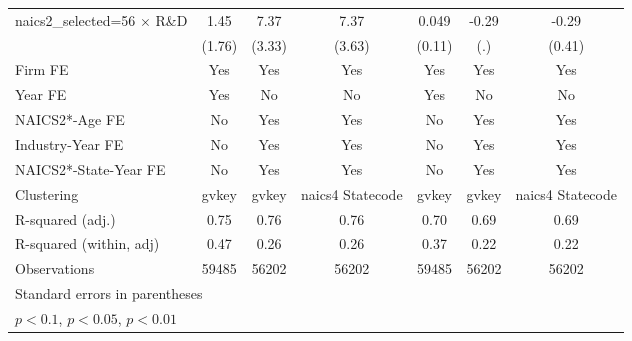 {\begin{tabular}{l*{6}{c}}
\addlinespace
naics2\_selected=56 $\times$ R\&D&        1.45         &        7.37\sym{**} &        7.37\sym{**} &       0.049         &       -0.29         &       -0.29         \\
                    &      (1.76)         &      (3.33)         &      (3.63)         &      (0.11)         &         (.)         &      (0.41)         \\
\addlinespace
Firm FE             &         Yes         &         Yes         &         Yes         &         Yes         &         Yes         &         Yes         \\
\addlinespace
Year FE             &         Yes         &          No         &          No         &         Yes         &          No         &          No         \\
\addlinespace
NAICS2*-Age FE      &          No         &         Yes         &         Yes         &          No         &         Yes         &         Yes         \\
\addlinespace
Industry-Year FE    &          No         &         Yes         &         Yes         &          No         &         Yes         &         Yes         \\
\addlinespace
NAICS2*-State-Year FE&          No         &         Yes         &         Yes         &          No         &         Yes         &         Yes         \\
\midrule
Clustering          &       gvkey         &       gvkey         &naics4 Statecode         &       gvkey         &       gvkey         &naics4 Statecode         \\
R-squared (adj.)    &        0.75         &        0.76         &        0.76         &        0.70         &        0.69         &        0.69         \\
R-squared (within, adj)&        0.47         &        0.26         &        0.26         &        0.37         &        0.22         &        0.22         \\
Observations        &       59485         &       56202         &       56202         &       59485         &       56202         &       56202         \\
\bottomrule
\multicolumn{7}{l}{\footnotesize Standard errors in parentheses}\\
\multicolumn{7}{l}{\footnotesize \sym{*} \(p<0.1\), \sym{**} \(p<0.05\), \sym{***} \(p<0.01\)}\\
\end{tabular}
}
